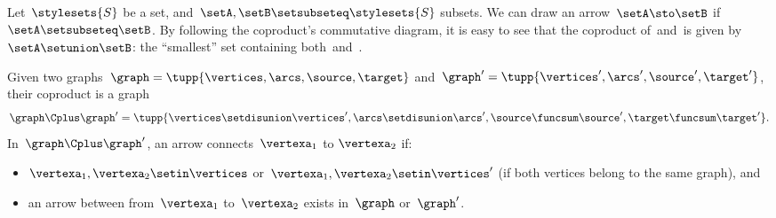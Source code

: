 \begin{example}
    \label{ex:subset_coprod}
    Let~$\stylesets{S}$ be a set, and~$\setA,\setB\setsubseteq \stylesets{S}$ subsets.
    We can draw an arrow~$\setA \sto \setB$ if~$\setA\setsubseteq \setB$.
    By following the coproduct's commutative diagram, it is easy to see that the coproduct of~\setA and~\setB is given by~$\setA\setunion\setB$: the ``smallest'' set containing both~\setA and~\setB.
\end{example}

\begin{example}
    \label{def:ex_graph}
    Given two graphs~$\graph=\tupp{\vertices,\arcs,\source,\target}$ and~$\graph'=\tupp{\vertices',\arcs',\source',\target'}$, their coproduct is a graph
    \begin{equation}
        \graph\Cplus\graph'=\tupp{\vertices \setdisunion\vertices',\arcs \setdisunion\arcs',\source\funcsum\source',\target\funcsum\target'}.
    \end{equation}
    In~$\graph\Cplus\graph'$, an arrow connects~$\vertexa_1$ to $\vertexa_2$ if:
    \begin{itemize}
        \item $\vertexa_1,\vertexa_2\setin \vertices$ or~$\vertexa_1,\vertexa_2\setin \vertices'$ (if both vertices belong to the same graph), and
        \item an arrow between from~$\vertexa_1$ to~$\vertexa_2$ exists in~$\graph$ or~$\graph'$.
    \end{itemize}

\end{example}
